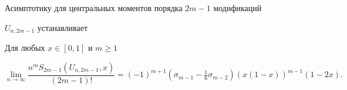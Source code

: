 


Асимптотику для центральных моментов порядка $2m-1$ модификаций 


$U_{n,2m-1}$ устанавливает 


 


\begin{lem} 


Для любых $x\in[0,1]$ и $m\ge1$ 


\begin{equation} 


\lim_{n\to\infty}\frac{n^m S_{2m-1}(U_{n,2m-1},x)}{(2m-1)!}= 


(-1)^{m+1}(\sigma_{m-1}-\tfrac{1}{6}\sigma_{m-2}) 


(x(1-x))^{m-1}(1-2x). 


\end{equation} 


\end{lem} 


 


